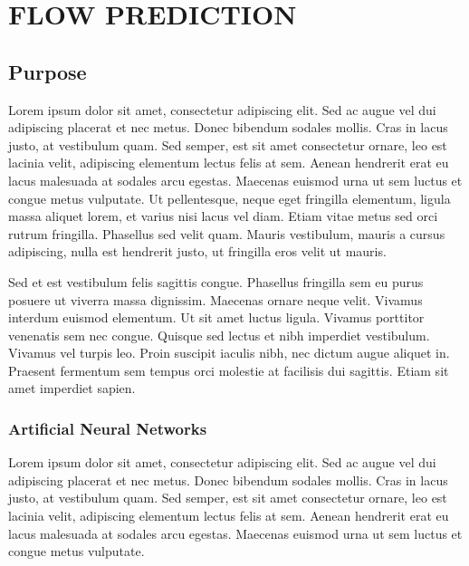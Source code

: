 \chapter{FLOW PREDICTION}\label{ch:fp}

\section{Purpose}

Lorem ipsum dolor sit amet, consectetur adipiscing elit. Sed ac augue vel dui 
adipiscing placerat et nec metus. Donec bibendum sodales mollis. Cras in lacus 
justo, at vestibulum quam. Sed semper, est sit amet consectetur ornare, leo est 
lacinia velit, adipiscing elementum lectus felis at sem. Aenean hendrerit erat eu 
lacus malesuada at sodales arcu egestas. Maecenas euismod urna ut sem luctus et 
congue metus vulputate. Ut pellentesque, neque eget fringilla elementum, ligula 
massa aliquet lorem, et varius nisi lacus vel diam. Etiam vitae metus sed orci 
rutrum fringilla. Phasellus sed velit quam. Mauris vestibulum, mauris a cursus 
adipiscing, nulla est hendrerit justo, ut fringilla eros velit ut mauris.

Sed et est vestibulum felis sagittis congue. Phasellus fringilla sem eu purus 
posuere ut viverra massa dignissim. Maecenas ornare neque velit. Vivamus interdum 
euismod elementum. Ut sit amet luctus ligula. Vivamus porttitor venenatis sem nec 
congue. Quisque sed lectus et nibh imperdiet vestibulum. Vivamus vel turpis leo. 
Proin suscipit iaculis nibh, nec dictum augue aliquet in. Praesent fermentum sem 
tempus orci molestie at facilisis dui sagittis. Etiam sit amet imperdiet sapien. 

\subsection{Artificial Neural Networks}

Lorem ipsum dolor sit amet, consectetur adipiscing elit. Sed ac augue vel dui 
adipiscing placerat et nec metus. Donec bibendum sodales mollis. Cras in lacus 
justo, at vestibulum quam. Sed semper, est sit amet consectetur ornare, leo est 
lacinia velit, adipiscing elementum lectus felis at sem. Aenean hendrerit erat eu 
lacus malesuada at sodales arcu egestas. Maecenas euismod urna ut sem luctus et 
congue metus vulputate.

